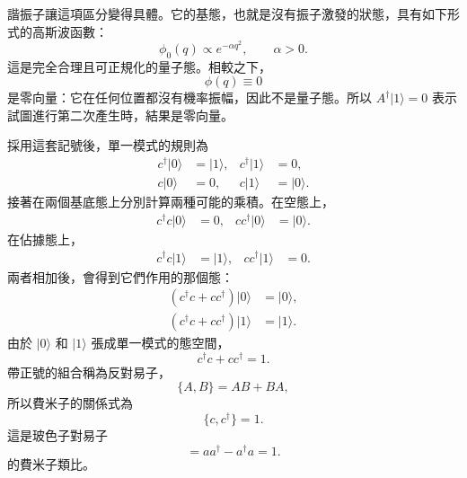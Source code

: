 諧振子讓這項區分變得具體。它的基態，也就是沒有振子激發的狀態，具有如下形式的高斯波函數：
\begin{equation}
\phi_0(q)\propto e^{-\alpha q^2},
\qquad \alpha>0.
\end{equation}
這是完全合理且可正規化的量子態。相較之下，
\begin{equation}
\phi(q)\equiv0
\end{equation}
是零向量：它在任何位置都沒有機率振幅，因此不是量子態。所以 \(A^\dagger|1\rangle=0\) 表示試圖進行第二次產生時，結果是零向量。

\begin{classroomqa}
\end{classroomqa}

採用這套記號後，單一模式的規則為
\begin{align}
c^\dagger|0\rangle&=|1\rangle,
&c^\dagger|1\rangle&=0,
\\
c|0\rangle&=0,
&c|1\rangle&=|0\rangle.
\end{align}
接著在兩個基底態上分別計算兩種可能的乘積。在空態上，
\begin{align}
c^\dagger c|0\rangle&=0,
&
cc^\dagger|0\rangle&=|0\rangle.
\end{align}
在佔據態上，
\begin{align}
c^\dagger c|1\rangle&=|1\rangle,
&
cc^\dagger|1\rangle&=0.
\end{align}
兩者相加後，會得到它們作用的那個態：
\begin{align}
(c^\dagger c+cc^\dagger)|0\rangle&=|0\rangle,
\\
(c^\dagger c+cc^\dagger)|1\rangle&=|1\rangle.
\end{align}
由於 \(|0\rangle\) 和 \(|1\rangle\) 張成單一模式的態空間，
\begin{equation}
c^\dagger c+cc^\dagger=1.
\end{equation}
帶正號的組合稱為反對易子，
\begin{equation}
\{A,B\}=AB+BA,
\end{equation}
所以費米子的關係式為
\begin{equation}
\{c,c^\dagger\}=1.
\end{equation}
這是玻色子對易子
\begin{equation}
[a,a^\dagger]=aa^\dagger-a^\dagger a=1.
\end{equation}
的費米子類比。

